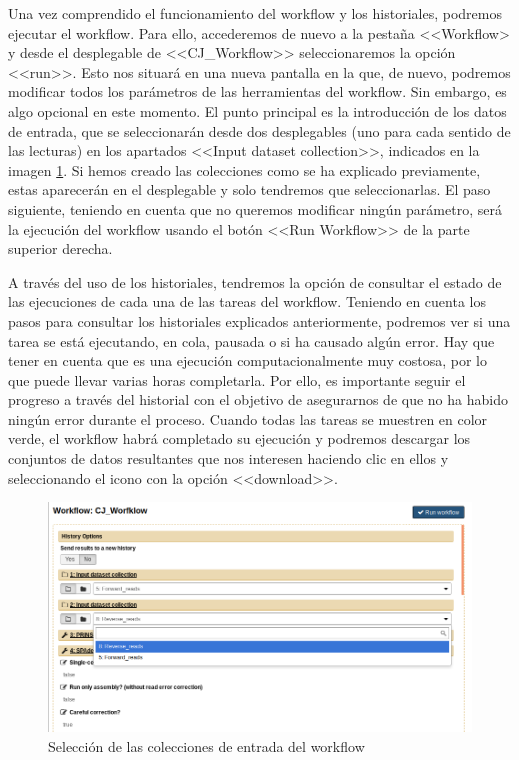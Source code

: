 Una vez comprendido el funcionamiento del workflow y los historiales, podremos ejecutar el workflow. Para ello, accederemos de nuevo a la pestaña <<Workflow> y desde el desplegable de <<CJ\_Workflow>> seleccionaremos la opción <<run>>. Esto nos situará en una nueva pantalla en la que, de nuevo, podremos modificar todos los parámetros de las herramientas del workflow. Sin embargo, es algo opcional en este momento. El punto principal es la introducción de los datos de entrada, que se seleccionarán desde dos desplegables (uno para cada sentido de las lecturas) en los apartados <<Input dataset collection>>, indicados en la imagen \ref{fig:RunInputs}. Si hemos creado las colecciones como se ha explicado previamente, estas aparecerán en el desplegable y solo tendremos que seleccionarlas. El paso siguiente, teniendo en cuenta que no queremos modificar ningún parámetro, será la ejecución del workflow usando el botón <<Run Workflow>> de la parte superior derecha.

A través del uso de los historiales, tendremos la opción de consultar el estado de las ejecuciones de cada una de las tareas del workflow. Teniendo en cuenta los pasos para consultar los historiales explicados anteriormente, podremos ver si una tarea se está ejecutando, en cola, pausada o si ha  causado algún error. Hay que tener en cuenta que es una ejecución computacionalmente muy costosa, por lo que puede llevar varias horas completarla. Por ello, es importante seguir el progreso a través del historial con el objetivo de asegurarnos de que no ha habido ningún error durante el proceso. Cuando todas las tareas se muestren en color verde, el workflow habrá completado su ejecución y podremos descargar los conjuntos de datos resultantes que nos interesen haciendo clic en ellos y seleccionando el icono con la opción <<download>>.

\begin{figure}
    \begin{center}
      \includegraphics[scale=0.5]{images/RunInputs.png}
      \caption{Selección de las colecciones de entrada del workflow}
      \label{fig:RunInputs}
    \end{center}
\end{figure}


